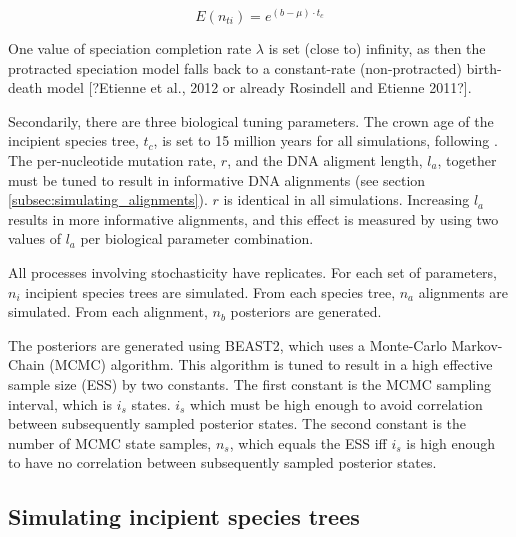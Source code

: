 \begin{equation}
  E(n_{ti}) = e^{ (b - \mu) \cdot t_c }
\end{equation}

One value of speciation completion rate $\lambda$ is set (close to) infinity, as
then the protracted speciation model falls back to a constant-rate 
(non-protracted) birth-death model [?Etienne et al., 2012 or already Rosindell and Etienne 2011?].


Secondarily, there are three biological tuning parameters. The crown age of
the incipient species tree, $t_c$, is set to 15 million years for all simulations, 
following \cite{etienne2014estimating}. The per-nucleotide mutation rate, $r$, and the
DNA aligment length, $l_a$, together must be tuned to result in informative
DNA alignments (see section \ref{subsec:simulating_alignments}). $r$ is identical in all
simulations. Increasing $l_a$ results in more informative alignments, and this
effect is measured by using two values of $l_a$ 
per biological parameter combination.


All processes involving stochasticity have replicates. 
For each set of parameters, $n_i$ incipient species trees are simulated. 
From each species tree, $n_a$ alignments are simulated. From each alignment, 
$n_b$ posteriors are generated.


The posteriors are generated using BEAST2, which uses a Monte-Carlo Markov-Chain (MCMC)
algorithm. This algorithm is tuned to result in a high effective sample size (ESS) by
two constants. The first constant is the MCMC sampling interval, which is $i_s$ states.
$i_s$ which must be high enough to avoid correlation between subsequently sampled posterior states.  
The second constant is the number of MCMC state samples, $n_s$, which equals the ESS iff 
$i_s$ is high enough to have no correlation between subsequently sampled posterior states.

\subsection{Simulating incipient species trees}
\label{subsec:simulating_incipient_species_trees}

